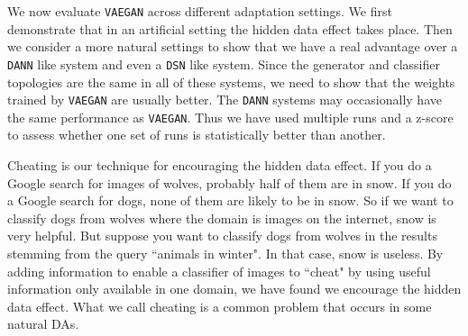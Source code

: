 \documentclass{article}
\newcommand{\elisa}[1]{\textbf{\color{red}Elisa: #1}}
\newcommand{\markw}[1]{\textbf{\color{green}Mark: #1}}
\begin{document}
 

We now evaluate \verb "VAEGAN" across different adaptation settings. We first demonstrate that in an artificial setting the hidden data effect takes place. Then we consider a more natural settings to show that we have a real advantage over a \verb"DANN" like system and even a \verb"DSN" like system. Since the generator and classifier topologies are the same in all of these systems, we need to show that the weights trained by \verb"VAEGAN" are usually better. The \verb"DANN" systems may occasionally have the same performance as \verb"VAEGAN". Thus we have used multiple runs and a z-score to assess whether one set of runs is statistically better than another.


Cheating is our technique for encouraging the hidden data effect. If you do a Google search for images of wolves, probably half of them are in snow. If you do a Google search for dogs, none of them are likely to be in snow. So if we want to classify dogs from wolves where the domain is images on the internet, snow is very helpful. But suppose you want to classify dogs from wolves in the results stemming from the query ``animals in winter". In that case, snow is useless. By adding information to enable a classifier of images to ``cheat" by using useful information only available in one domain, we have found we encourage the hidden data effect. What we call cheating is a common problem that occurs in some natural DAs.
\end{document}
